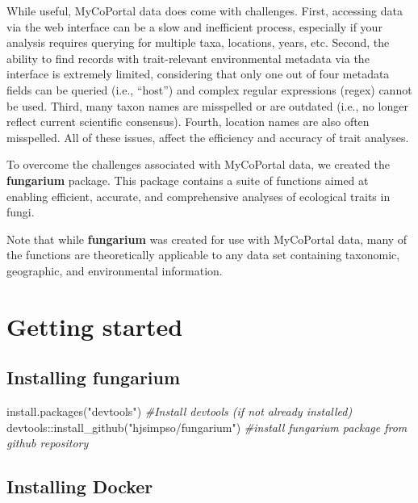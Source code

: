 \documentclass[
]{book}
\newenvironment{Shaded}{\begin{snugshade}}{\end{snugshade}}
\newcommand{\CommentTok}[1]{\textcolor[rgb]{0.56,0.35,0.01}{\textit{#1}}}
\newcommand{\FunctionTok}[1]{\textcolor[rgb]{0.00,0.00,0.00}{#1}}
\newcommand{\NormalTok}[1]{#1}
\newcommand{\SpecialCharTok}[1]{\textcolor[rgb]{0.00,0.00,0.00}{#1}}
\newcommand{\StringTok}[1]{\textcolor[rgb]{0.31,0.60,0.02}{#1}}
\begin{document}
While useful, MyCoPortal data does come with challenges. First, accessing data via the web interface can be a slow and inefficient process, especially if your analysis requires querying for multiple taxa, locations, years, etc. Second, the ability to find records with trait-relevant environmental metadata via the interface is extremely limited, considering that only one out of four metadata fields can be queried (i.e., ``host'') and complex regular expressions (regex) cannot be used. Third, many taxon names are misspelled or are outdated (i.e., no longer reflect current scientific consensus). Fourth, location names are also often misspelled. All of these issues, affect the efficiency and accuracy of trait analyses.

To overcome the challenges associated with MyCoPortal data, we created the \textbf{fungarium} package. This package contains a suite of functions aimed at enabling efficient, accurate, and comprehensive analyses of ecological traits in fungi.

Note that while \textbf{fungarium} was created for use with MyCoPortal data, many of the functions are theoretically applicable to any data set containing taxonomic, geographic, and environmental information.

\hypertarget{getting-started}{%
\section{Getting started}\label{getting-started}}

\hypertarget{installing-fungarium}{%
\subsection{Installing fungarium}\label{installing-fungarium}}

\begin{Shaded}
\begin{Highlighting}[]
\FunctionTok{install.packages}\NormalTok{(}\StringTok{"devtools"}\NormalTok{) }\CommentTok{\#Install \textquotesingle{}devtools\textquotesingle{} (if not already installed)}
\NormalTok{devtools}\SpecialCharTok{::}\FunctionTok{install\_github}\NormalTok{(}\StringTok{"hjsimpso/fungarium"}\NormalTok{) }\CommentTok{\#install fungarium package from github repository}
\end{Highlighting}
\end{Shaded}

\hypertarget{installing-docker}{%
\subsection{Installing Docker}\label{installing-docker}}
\end{document}
